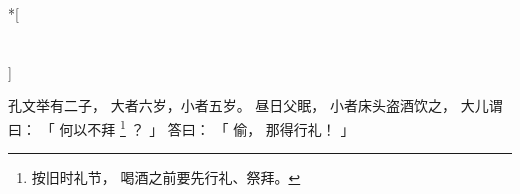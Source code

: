
\switchcolumn[0]*[\section{}]

孔文举有二子，
大者六岁，小者五岁。
昼日父眠，
小者床头盗酒饮之，
大儿谓曰：
「
    何以不拜%
    \footnote{%
        按旧时礼节，
        喝酒之前要先行礼、祭拜。
    }%
    ？
」
答曰：
「
    偷，
    那得行礼！
」

\switchcolumn



